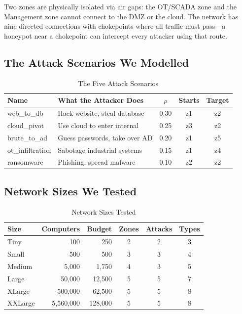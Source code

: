 \documentclass[journal]{IEEEtran}
\begin{document}
Two zones are physically isolated via air gaps: the OT/SCADA
zone and the Management zone cannot connect to the DMZ or
the cloud.
The network has nine directed connections with chokepoints
where all traffic must pass---a honeypot near a chokepoint
can intercept every attacker using that route.

\subsection{The Attack Scenarios We Modelled}

\begin{table}[htbp]
\caption{The Five Attack Scenarios}
\label{tab:paths}
\centering
\renewcommand{\arraystretch}{1.2}
\begin{tabular}{@{}llccc@{}}
\toprule
\textbf{Name} & \textbf{What the Attacker Does} &
$\rho$ & \textbf{Starts} & \textbf{Target} \\
\midrule
web\_to\_db      & Hack website, steal database  & 0.30 & z1 & z2 \\
cloud\_pivot     & Use cloud to enter internal   & 0.25 & z3 & z2 \\
brute\_to\_ad    & Guess passwords, take over AD & 0.20 & z1 & z5 \\
ot\_infiltration & Sabotage industrial systems   & 0.15 & z1 & z4 \\
ransomware       & Phishing, spread malware      & 0.10 & z2 & z2 \\
\bottomrule
\end{tabular}
\end{table}

\subsection{Network Sizes We Tested}

\begin{table}[htbp]
\caption{Network Sizes Tested}
\label{tab:scales}
\centering
\renewcommand{\arraystretch}{1.2}
\begin{tabular}{@{}lrrccc@{}}
\toprule
\textbf{Size} & \textbf{Computers} & \textbf{Budget} &
\textbf{Zones} & \textbf{Attacks} & \textbf{Types} \\
\midrule
Tiny    &        100 &    250 & 2 & 2 & 3 \\
Small   &        500 &    500 & 3 & 3 & 4 \\
Medium  &      5,000 &  1,750 & 4 & 3 & 5 \\
Large   &     50,000 & 12,500 & 5 & 5 & 7 \\
XLarge  &    500,000 & 62,500 & 5 & 5 & 8 \\
XXLarge & 5,560,000  &128,000 & 5 & 5 & 8 \\
\bottomrule
\end{tabular}
\end{table}
\end{document}
